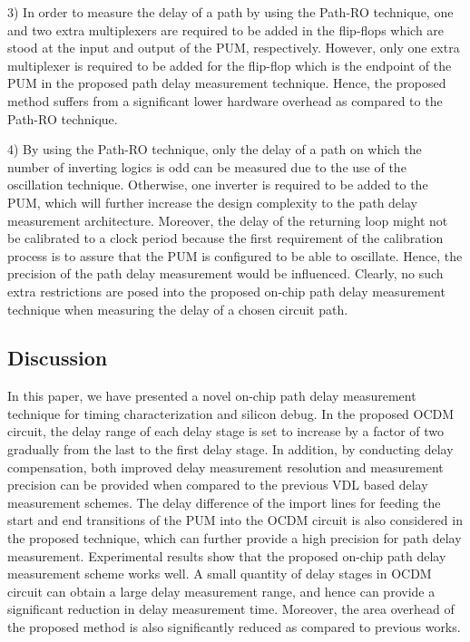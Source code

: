 3) In order to measure the delay of a path by using the Path-RO technique, one and two extra multiplexers are required to be added in the flip-flops which are stood at the input and output of the PUM, respectively. However, only one extra multiplexer is required to be added for the flip-flop which is the endpoint of the PUM in the proposed path delay measurement technique. Hence, the proposed method suffers from a significant lower hardware overhead as compared to the Path-RO technique.

4) By using the Path-RO technique, only the delay of a path on which the number of inverting logics is odd can be measured due to the use of the oscillation technique. Otherwise, one inverter is required to be added to the PUM, which will further increase the design complexity to the path delay measurement architecture. Moreover, the delay of the returning loop might not be calibrated to a clock period because the first requirement of the calibration process is to assure that the PUM is configured to be able to oscillate. Hence, the precision of the path delay measurement would be influenced. Clearly, no such extra restrictions are posed into the proposed on-chip path delay measurement technique when measuring the delay of a chosen circuit path.

\subsection{Discussion}
In this paper, we have presented a novel on-chip path delay measurement technique for timing characterization and silicon debug. In the proposed OCDM circuit, the delay range of each delay stage is set to increase by a factor of two gradually from the last to the first delay stage. In addition, by conducting delay compensation, both improved delay measurement resolution and measurement precision can be provided when compared to the previous VDL based delay measurement schemes. The delay difference of the import lines for feeding the start and end transitions of the PUM into the OCDM circuit is also considered in the proposed technique, which can further provide a high precision for path delay measurement. Experimental results show that the proposed on-chip path delay measurement scheme works well. A small quantity of delay stages in OCDM circuit can obtain a large delay measurement range, and hence can provide a significant reduction in delay measurement time. Moreover, the area overhead of the proposed method is also significantly reduced as compared to previous works.

